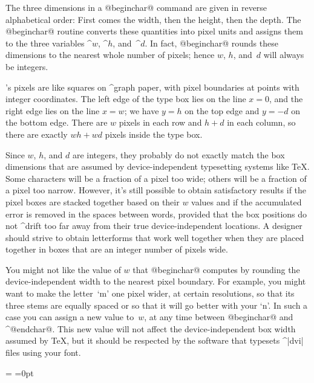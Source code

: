{{{{The three dimensions in a @beginchar@ command are given in reverse
alphabetical order: First comes the width, then the height, then the depth.
The @beginchar@ routine converts these quantities into pixel units
and assigns them to the three variables ^{$w$}, ^{$h$}, and~^{$d$}. In fact,
@beginchar@ rounds these dimensions to the nearest whole number of
pixels; hence $w$, $h$, and~$d$ will always be integers.

\MF's pixels are like squares on ^{graph paper}, with pixel boundaries
at points with integer coordinates. The left edge of the type box lies
on the line $x=0$, and the right edge lies on the line $x=w$; we have
$y=h$ on the top edge and $y=-d$ on the bottom edge. There are $w$ pixels
in each row and $h+d$ in each column, so there are exactly $wh+wd$ pixels
inside the type box.

Since $w$, $h$, and $d$ are integers, they probably do not exactly match
the box dimensions that are assumed by device-independent typesetting
systems like \TeX. Some characters will be a fraction of a pixel too wide;
others will be a fraction of a pixel too narrow. However, it's still possible
to obtain satisfactory results if the pixel boxes are stacked together
based on their $w$ values and if the accumulated error is removed in the
spaces between words, provided that the box positions do not ^{drift}
too far away from their true device-independent locations. A designer should
strive to obtain letterforms that work well together when they are placed
together in boxes that are an integer number of pixels wide.

\ddanger You might not like the value of $w$ that @beginchar@ computes by
rounding the device-independent width to the nearest pixel boundary.
For example, you might want to make the letter~`m' one pixel wider, at
certain resolutions, so that its three stems are equally spaced or so that
it will go better with your `n'. In such a case you can assign a new value
to~$w$, at any time between @beginchar@ and ^@endchar@. This new value
will not affect the device-independent box width assumed by \TeX, but it
should be respected by the software that typesets ^|dvi| files using your font.

\def\hidecoords(#1,#2){\hbox to 0pt{\hss$\scriptstyle(#1,#2)$\hss}}
=\vtop{\kern -94pt
  \rightline{\vbox{\hbox to 140\apspix{\hidecoords(0,h)\hfil
        \hidecoords(w\mkern-2mu,h)}
      \kern3pt
      \figbox{12a}{140\apspix}{360\apspix}\vbox
      \kern-3pt
      \hbox to 140\apspix{\hidecoords(0,-d)\hfil
        \hidecoords(w\mkern-2mu,-d)}}\quad}}
=0pt

}}}}
